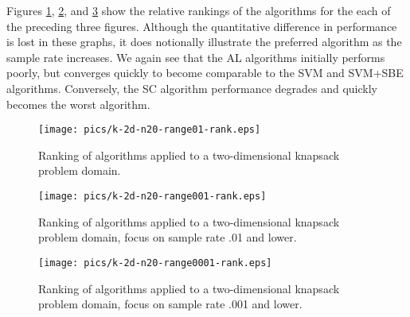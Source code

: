 Figures \ref{fig:knapsack-2d-range01-rank}, \ref{fig:knapsack-2d-range001-rank}, and \ref{fig:knapsack-2d-range0001-rank} show the relative rankings of the algorithms for the each of the preceding three figures.  Although the quantitative difference in performance is lost in these graphs, it does notionally illustrate the preferred algorithm as the sample rate increases.  We again see that the AL algorithms initially performs poorly, but converges quickly to become comparable to the SVM and SVM+SBE algorithms.  Conversely, the SC algorithm performance degrades and quickly becomes the worst algorithm. 

\begin{figure}
\begin{center}
\texttt{[image: pics/k-2d-n20-range01-rank.eps]}
\caption{Ranking of algorithms applied to a two-dimensional knapsack problem domain.}
\label{fig:knapsack-2d-range01-rank}
\end{center}
\end{figure}


\begin{figure}
\begin{center}
\texttt{[image: pics/k-2d-n20-range001-rank.eps]}
\caption{Ranking of algorithms applied to a two-dimensional knapsack problem domain, focus on sample rate .01 and lower.}
\label{fig:knapsack-2d-range001-rank}
\end{center}
\end{figure}

\begin{figure}
\begin{center}
\texttt{[image: pics/k-2d-n20-range0001-rank.eps]}
\caption{Ranking of algorithms applied to a two-dimensional knapsack problem domain, focus on sample rate .001 and lower.}
\label{fig:knapsack-2d-range0001-rank}
\end{center}
\end{figure}


